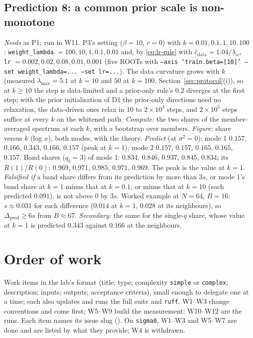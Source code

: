 \documentclass[11pt,a4paper]{article}
\newcommand{\code}[1]{\texttt{#1}}
\begin{document}
\subsection{Prediction 8: a common prior scale is non-monotone}
\label{sec:P8}
\emph{Needs} as P1; run in W11. P3's setting ($\beta = 10$, $r = 0$) with $k = 0.01, 0.1, 1, 10, 100$: \code{weight\_lambda} $= 100, 10, 1, 0.1, 0.01$ and, by \eqref{eq:lr-rule} with $\hat c_{\mathrm{data}} = 1.04/\lambda_w$, \code{lr} $= 0.002, 0.02, 0.08, 0.01, 0.001$ (five ROOTs with \code{--axis 'train.beta=[10]' --set weight\_lambda=... --set lr=...}). The data curvature grows with $k$ (measured $\lambda_{\max} = 5.1$ at $k = 10$ and $50$ at $k = 100$, Section~\ref{sec:protocol}(i)), so at $k\ge10$ the step is data-limited and a prior-only rule's $0.2$ diverges at the first step; with the prior initialisation of D1 the prior-only directions need no relaxation, the data-driven ones relax in $10$ to $2\times10^3$ steps, and $2\times10^5$ steps suffice at every $k$ on the whitened path. \emph{Compute:} the two shares of the member-averaged spectrum at each $k$, with a bootstrap over members. \emph{Figure:} share versus $k$ (log $x$), both modes, with the theory. \emph{Predict} (at $\sigma^2 = 0$): mode 1 $0.157$, $0.166$, $0.343$, $0.166$, $0.157$ (peak at $k = 1$); mode 2 $0.157$, $0.157$, $0.165$, $0.165$, $0.157$. Band shares ($q_b = 3$) of mode 1: $0.834$, $0.846$, $0.937$, $0.845$, $0.834$; its $R(1)/R(0)$: $0.969$, $0.971$, $0.985$, $0.971$, $0.969$. The peak is the value at $k = 1$. \emph{Falsified if} a band share differs from its prediction by more than $3s$, or mode 1's band share at $k = 1$ minus that at $k = 0.1$, or minus that at $k = 10$ (each predicted $0.091$), is not above $0$ by $3s$. Worked example at $N = 64$, $B = 16$: $s\approx0.031$ for each difference ($0.014$ at $k = 1$, $0.028$ at its neighbours), so $\Delta_{\mathrm{pred}}\ge6s$ from $B\approx67$. \emph{Secondary:} the same for the single-$q$ share, whose value at $k = 1$ is predicted $0.343$ against $0.166$ at the neighbours.

\section{Order of work}
\label{sec:order}
Work items in the lab's format (title; type; complexity \code{simple} or \code{complex}; description; inputs; outputs; acceptance criteria), small enough to delegate one at a time; each also updates  and runs the full suite and \code{ruff}. W1--W3 change conventions and come first; W5--W9 build the measurement; W10--W12 are the runs. Each item names its issue slug (). On \code{sigma0}, W1--W3 and W5--W7 are done and are listed by what they provide; W4 is withdrawn.
\end{document}
